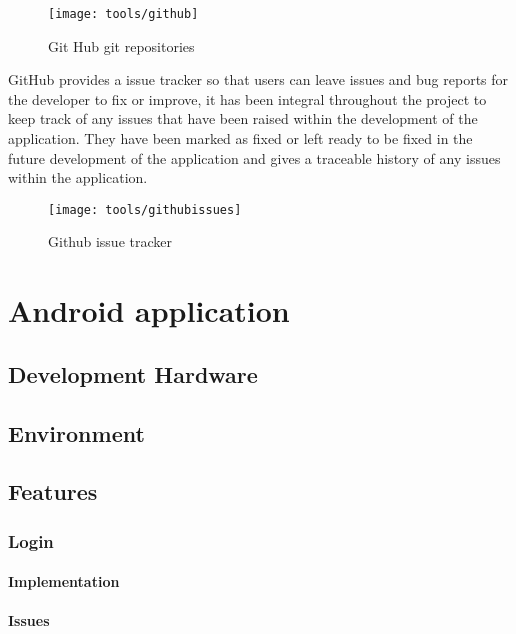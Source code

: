 \begin{figure}[H]
    \centering
    \texttt{[image: tools/github]}
    \caption{Git Hub git repositories}
    \label{fig:git_hub_repos_image}
\end{figure} 

\noindent
GitHub provides a issue tracker so that users can leave issues and bug reports for the developer to fix or improve, it has been integral throughout the project to keep track of any issues that have been raised within the development of the application. They have been marked as fixed or left ready to be fixed in the future development of the application and gives a traceable history of any issues within the application.

\begin{figure}[H]
    \centering
    \texttt{[image: tools/githubissues]}
    \caption{Github issue tracker}
    \label{fig:gh_issue_tracker_image}
\end{figure} 

\section{Android application}

\subsection{Development Hardware}

\subsection{Environment}

\subsection{Features}


\subsubsection*{Login}

\paragraph*{Implementation}

\paragraph*{Issues}


